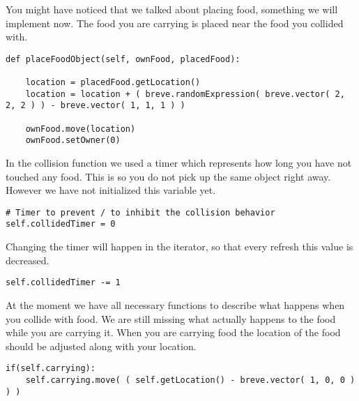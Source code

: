 You might have noticed that we talked about placing food, something we will implement now. The food you are carrying is placed near the food you collided with.

\begin{fullwidth}
\begin{lstlisting}
def placeFoodObject(self, ownFood, placedFood):

    location = placedFood.getLocation()
    location = location + ( breve.randomExpression( breve.vector( 2, 2, 2 ) ) - breve.vector( 1, 1, 1 ) )

    ownFood.move(location)
    ownFood.setOwner(0)
\end{lstlisting}
\end{fullwidth}

In the collision function we used a timer which represents how long you have not touched any food. This is so you do not pick up the same object right away. However we have not initialized this variable yet.
\begin{fullwidth}
\begin{lstlisting}
# Timer to prevent / to inhibit the collision behavior
self.collidedTimer = 0
\end{lstlisting}
\end{fullwidth}

Changing the timer will happen in the iterator, so that every refresh this value is decreased.

\begin{lstlisting}
self.collidedTimer -= 1
\end{lstlisting}

At the moment we have all necessary functions to describe what happens when you collide with food. We are still missing what actually happens to the food while you are carrying it. When you are carrying food the location of the food should be adjusted along with your location.
\begin{fullwidth}
\begin{lstlisting}
if(self.carrying):
    self.carrying.move( ( self.getLocation() - breve.vector( 1, 0, 0 ) ) )
\end{lstlisting}
\end{fullwidth}

